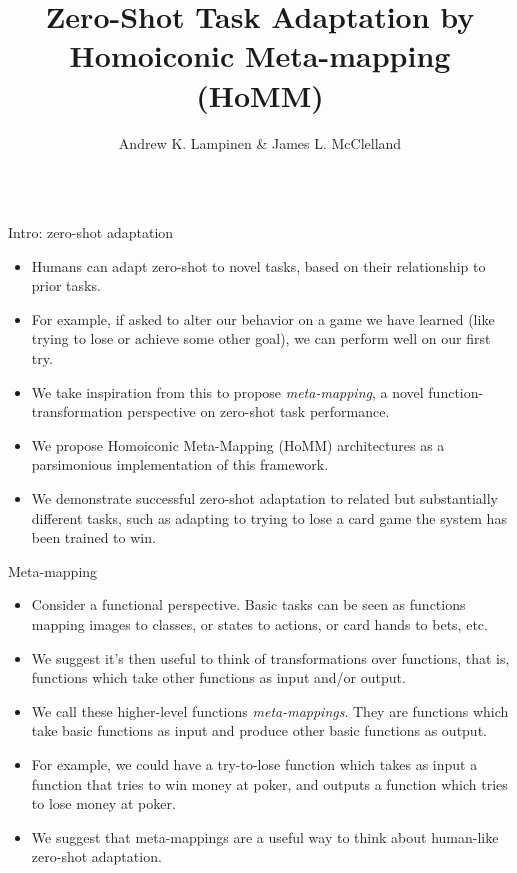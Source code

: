\documentclass[final]{beamer}
\title{Zero-Shot Task Adaptation by Homoiconic Meta-mapping (HoMM)}
\author{Andrew K. Lampinen \& James L. McClelland}
\institute{Department of Psychology, Stanford University}
\begin{document}
\begin{frame}[t]{}
\vspace{-1em}
\begin{columns}

\begin{column}[t]{0.248\textwidth}
\begin{block}{\huge Intro: zero-shot adaptation}
\vspace{-0.6em}
\begin{itemize}
\item Humans can adapt zero-shot to novel tasks, based on their relationship to prior tasks.
\item For example, if asked to alter our behavior on a game we have learned (like trying to lose or achieve some other goal), we can perform well on our first try.
\item We take inspiration from this to propose \emph{meta-mapping}, a novel function-transformation perspective on zero-shot task performance.
\item We propose Homoiconic Meta-Mapping (HoMM) architectures as a parsimonious implementation of this framework.
\item We demonstrate successful zero-shot adaptation to related but substantially different tasks, such as adapting to trying to lose a card game the system has been trained to win.
\end{itemize}
\end{block}
\begin{block}{\huge Meta-mapping}
\vspace{-0.6em}
\begin{itemize}
\item Consider a functional perspective. Basic tasks can be seen as functions mapping images to classes, or states to actions, or card hands to bets, etc.
\item We suggest it's then useful to think of transformations over functions, that is, functions which take other functions as input and/or output.
\item We call these higher-level functions \emph{meta-mappings}. They are functions which take basic functions as input and produce other basic functions as output.
\item For example, we could have a try-to-lose function which takes as input a function that tries to win money at poker, and outputs a function which tries to lose money at poker.
\item We suggest that meta-mappings are a useful way to think about human-like zero-shot adaptation.

\end{itemize}
\end{block}
\end{column}
\end{columns}
\end{frame}
\end{document}

